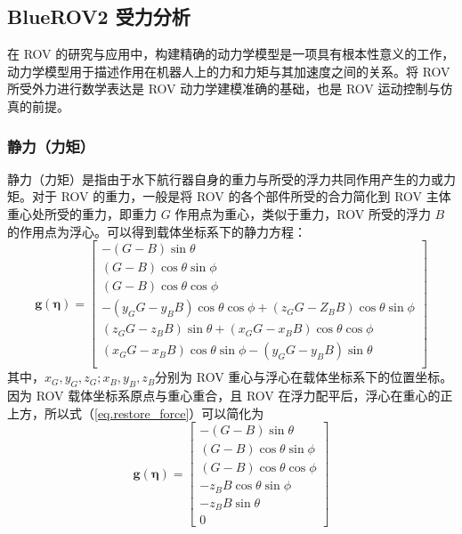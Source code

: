 \subsection{BlueROV2 受力分析}

在 ROV 的研究与应用中，构建精确的动力学模型是一项具有根本性意义的工作，动力学模型用于描述作用在机器人上的力和力矩与其加速度之间的关系。将 ROV 所受外力进行数学表达是 ROV 动力学建模准确的基础，也是 ROV 运动控制与仿真的前提。

\subsubsection{静力（力矩）}

静力（力矩）是指由于水下航行器自身的重力与所受的浮力共同作用产生的力或力矩。对于 ROV 的重力，一般是将 ROV 的各个部件所受的合力简化到 ROV 主体重心处所受的重力，即重力 $G$ 作用点为重心，类似于重力，ROV 所受的浮力 $B$ 的作用点为浮心。可以得到载体坐标系下的静力方程：
\begin{equation}
    \symbf{g}(\symbf{\eta}) = \begin{bmatrix}
        -(G-B)\sin\theta \\
        (G-B)\cos\theta\sin\phi \\
        (G-B)\cos\theta\cos\phi \\
        -(y_GG-y_BB)\cos\theta\cos\phi + (z_GG-Z_BB)\cos\theta\sin\phi \\
        (z_GG-z_BB)\sin\theta + (x_GG-x_BB)\cos\theta\cos\phi \\
        (x_GG-x_BB)\cos\theta\sin\phi - (y_GG-y_BB)\sin\theta \\
    \end{bmatrix}
    \label{eq.restore_force}
\end{equation}
其中，$x_G,y_G,z_G;x_B,y_B,z_B$分别为 ROV 重心与浮心在载体坐标系下的位置坐标。因为 ROV 载体坐标系原点与重心重合，且 ROV 在浮力配平后，浮心在重心的正上方，所以式（\ref{eq.restore_force}）可以简化为
\begin{equation}
    \symbf{g}(\symbf{\eta}) = \begin{bmatrix}
        -(G-B)\sin\theta \\
        (G-B)\cos\theta\sin\phi \\
        (G-B)\cos\theta\cos\phi \\
        -z_BB\cos\theta\sin\phi \\
        -z_BB\sin\theta \\
        0 
    \end{bmatrix}
\end{equation}


